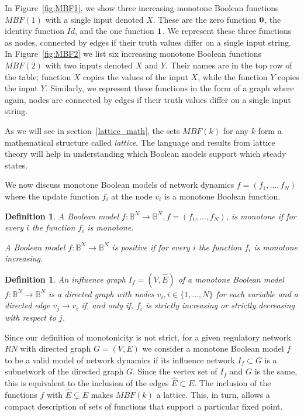 \documentclass[10pt,letterpaper]{article}
\newcommand{\bbB}{\mathbb{B}}
\newcommand{\bzero}{{\bf 0}}
\newcommand{\bone}{{\bf 1}}
\newtheorem{defn}[thm]{Definition}
\begin{document}
In Figure~\ref{fig:MBF1}, we show three increasing monotone Boolean functions $MBF(1)$ with a single input denoted $X$. These are the zero function $\bzero$, the identity function $Id$, and the one function $\bone$. We represent these three functions as nodes, connected by edges if their truth values differ on a single input string.
In Figure~\ref{fig:MBF2} we list six increasing monotone Boolean functions $MBF(2)$ with two inputs denoted $X$ and $Y$. Their names are in the top row of the table; function $X$ copies the values of the input $X$, while the function $Y$ copies the input $Y$. Similarly, we represent these functions in the form of a graph where again, nodes are connected by edges if their truth values differ on a single input string.

As we will see in section~\ref{lattice_math}, the sets $MBF(k)$ for any $k$ form a mathematical structure called \textit{lattice}. The language and results from lattice theory will help in understanding which Boolean models support which steady states. 

We now discuss monotone Boolean models of network dynamics $f=(f_1, \ldots, f_N)$ where the update function $f_i$ at the node $v_i$ is a monotone Boolean function. 

\begin{defn}
A Boolean model $f \colon \bbB^N \to \bbB^N, f=(f_1, \ldots, f_N)$, is \emph{monotone} if for every $i$ the function $f_i$ is monotone.


A Boolean model $f \colon \bbB^N \to \bbB^N$ is \emph{positive} if for every $i$ the function $f_i$ is monotone increasing.
\end{defn}


\begin{defn}
    An influence graph $I_f=(V,\hat{E})$ of a monotone Boolean model $f \colon \bbB^N \to \bbB^N$ is a directed graph with nodes $v_i, i\in \{1, \ldots, N\}$ for each variable and a directed edge $v_j\to v_i$ if, and only if, $f_i$ is strictly increasing or strictly decreasing with respect to $j$. 
\end{defn}

Since our definition of monotonicity is not strict, for a given regulatory network $RN$ with directed graph $G=(V,E)$ we consider a monotone Boolean model $f$ to be a valid model of network dynamics if its influence network $I_f \subset G$ is a subnetwork of the directed graph $G$. Since the vertex set of $I_f$ and $G$ is the same, this is equivalent to the inclusion of the edges $\hat{E} \subset E$. The inclusion of the functions $f$ with $\hat{E} \subsetneq E$  makes $MBF(k)$ a lattice. This, in turn, allows a compact description of sets of functions that support a particular fixed point. 
\end{document}
